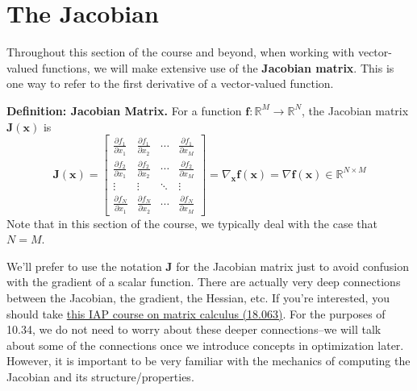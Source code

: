 \section{The Jacobian}

Throughout this section of the course and beyond, when working with vector-valued functions, we will make extensive use of the \textbf{Jacobian matrix}. This is one way to refer to the first derivative of a vector-valued function.

\begin{definitionBox}
\textbf{Definition: Jacobian Matrix.}
For a function $\mathbf{f}: \mathbb{R}^M \rightarrow \mathbb{R}^N$, the Jacobian matrix $\mathbf{J}(\mathbf{x})$ is
{\renewcommand{\arraystretch}{1.5}
\begin{equation}
\mathbf{J}(\mathbf{x}) = \begin{bmatrix}
\frac{\partial f_1}{\partial x_1} & \frac{\partial f_1}{\partial x_2} & \cdots & \frac{\partial f_1}{\partial x_M} \\
\frac{\partial f_2}{\partial x_1} & \frac{\partial f_2}{\partial x_2} & \cdots & \frac{\partial f_2}{\partial x_M} \\
\vdots & \vdots & \ddots & \vdots \\
\frac{\partial f_N}{\partial x_1} & \frac{\partial f_N}{\partial x_2} & \cdots & \frac{\partial f_N}{\partial x_M}
\end{bmatrix} = \nabla_{\mathbf{x}}\mathbf{f}(\mathbf{x}) = \nabla\mathbf{f}(\mathbf{x}) \in \mathbb{R}^{N \times M}
\end{equation}
}
Note that in this section of the course, we typically deal with the case that $N=M$.
\end{definitionBox}
We'll prefer to use the notation $\mathbf{J}$ for the Jacobian matrix just to avoid confusion with the gradient of a scalar function. There are actually very deep connections between the Jacobian, the gradient, the Hessian, etc. If you're interested, you should take \href{https://github.com/mitmath/matrixcalc}{this IAP course on matrix calculus (18.063)}. For the purposes of 10.34, we do not need to worry about these deeper connections--we will talk about some of the connections once we introduce concepts in optimization later. However, it is important to be very familiar with the mechanics of computing the Jacobian and its structure/properties.

